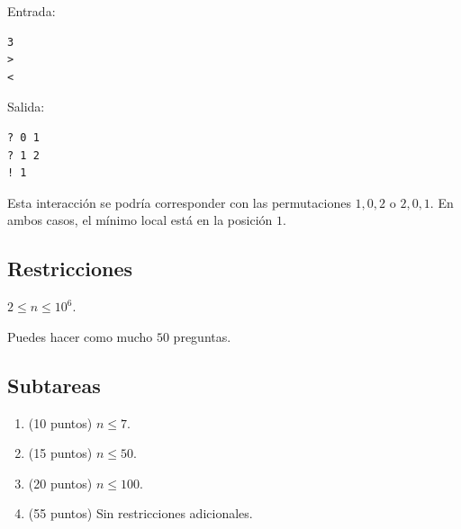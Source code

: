\documentclass[10.5pt]{article}
\begin{document}
Entrada:
\begin{verbatim}
3
>
<
\end{verbatim}

Salida:
\begin{verbatim}
? 0 1
? 1 2
! 1
\end{verbatim}

Esta interacci\'on se podr\'ia corresponder con las permutaciones $1, 0, 2$ o $2, 0, 1$. En ambos casos, el m\'inimo local est\'a en la posici\'on $1$.

\subsection*{Restricciones}

$2 \leq n \leq 10^6$.

Puedes hacer como mucho $50$ preguntas.

\subsection*{Subtareas}

\begin{enumerate}
    \item (10 puntos) $n \leq 7$.
    \item (15 puntos) $n \leq 50$.
    \item (20 puntos) $n \leq 100$.
    \item (55 puntos) Sin restricciones adicionales.
    
\end{enumerate}
\end{document}
